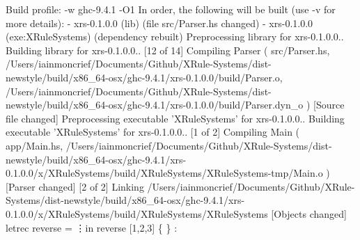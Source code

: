 Build profile: -w ghc-9.4.1 -O1
In order, the following will be built (use -v for more details):
 - xrs-0.1.0.0 (lib) (file src/Parser.hs changed)
 - xrs-0.1.0.0 (exe:XRuleSystems) (dependency rebuilt)
Preprocessing library for xrs-0.1.0.0..
Building library for xrs-0.1.0.0..
[12 of 14] Compiling Parser           ( src/Parser.hs, /Users/iainmoncrief/Documents/Github/XRule-Systems/dist-newstyle/build/x86_64-osx/ghc-9.4.1/xrs-0.1.0.0/build/Parser.o, /Users/iainmoncrief/Documents/Github/XRule-Systems/dist-newstyle/build/x86_64-osx/ghc-9.4.1/xrs-0.1.0.0/build/Parser.dyn_o ) [Source file changed]
Preprocessing executable 'XRuleSystems' for xrs-0.1.0.0..
Building executable 'XRuleSystems' for xrs-0.1.0.0..
[1 of 2] Compiling Main             ( app/Main.hs, /Users/iainmoncrief/Documents/Github/XRule-Systems/dist-newstyle/build/x86_64-osx/ghc-9.4.1/xrs-0.1.0.0/x/XRuleSystems/build/XRuleSystems/XRuleSystems-tmp/Main.o ) [Parser changed]
[2 of 2] Linking /Users/iainmoncrief/Documents/Github/XRule-Systems/dist-newstyle/build/x86_64-osx/ghc-9.4.1/xrs-0.1.0.0/x/XRuleSystems/build/XRuleSystems/XRuleSystems [Objects changed]
letrec reverse = \lambda\vdots in reverse [1,2,3]
\{  \} :  \Rightarrow \code{[3,2,1]}
